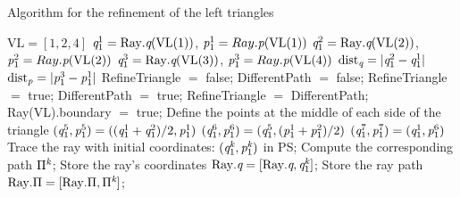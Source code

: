 \begin{algorithm}[h]
\caption{Algorithm for the refinement of the left triangles}\label{alg:left_triangle}
\begin{algorithmic}[1]
\State $\textrm{VL}= [1,2,4]$
\State $\textit{q}_1^1= \textrm{Ray}.\textit{q}(\textrm{VL}(1))$, $\textit{p}_1^1= Ray.\textit{p}(\textrm{VL}(1))$
\State $\textit{q}_1^2= \textrm{Ray}.\textit{q}(\textrm{VL}(2))$, $\textit{p}_1^2= Ray.\textit{p}(\textrm{VL}(2))$
\State $\textit{q}_1^3= \textrm{Ray}.\textit{q}(\textrm{VL}(3))$, $\textit{p}_1^3= Ray.\textit{p}(\textrm{VL}(4))$
\State $\textrm{dist}_{\textit{q}}= \mbox{$|\textit{q}_1^2-\textit{q}_1^1|$}$
\State $\textrm{dist}_{\textit{p}}= \mbox{$|\textit{p}_1^{3}-\textit{p}_1^1|$}$
\State RefineTriangle $=$  false;
\State DifferentPath $=$  false;
\State RefineTriangle $=$  true;
\EndIf
{}
\State DifferentPath $=$  true;
\EndIf
\EndFor
{}
\State RefineTriangle $=$  DifferentPath;
\Else
{}
\State Ray(\textrm{VL}).boundary $=$ true; 
\EndIf
\EndIf
{}
\State Define the points at the middle of each side of the triangle
\State $(\textit{q}_1^5, \textit{p}_1^5) = ((\textit{q}_1^1+\textit{q}_1^2)/2, \textit{p}_1^1)$
\State $(\textit{q}_1^6, \textit{p}_1^6) = (\textit{q}_1^5, (\textit{p}_1^1+\textit{p}_1^2)/2)$
\State $(\textit{q}_1^7, \textit{p}_1^7) = (\textit{q}_1^1, \textit{p}_1^6)$
\State Trace the ray with initial coordinates: $(\textit{q}_1^{\textit{k}}, \textit{p}_1^{\textit{k}})$ in PS;
\State Compute the corresponding path $\Pi^{\textit{k}}$;
\State Store the ray's coordinates $\mbox{Ray}.\textit{q}= [\mbox{Ray}.\textit{q}, \textit{q}_1^{\textit{k}}]$;
\State Store the ray path $\mbox{Ray}.\Pi= [\mbox{Ray}.\Pi, \Pi^{\textit{k}}]$;

\end{algorithmic}
\end{algorithm}
